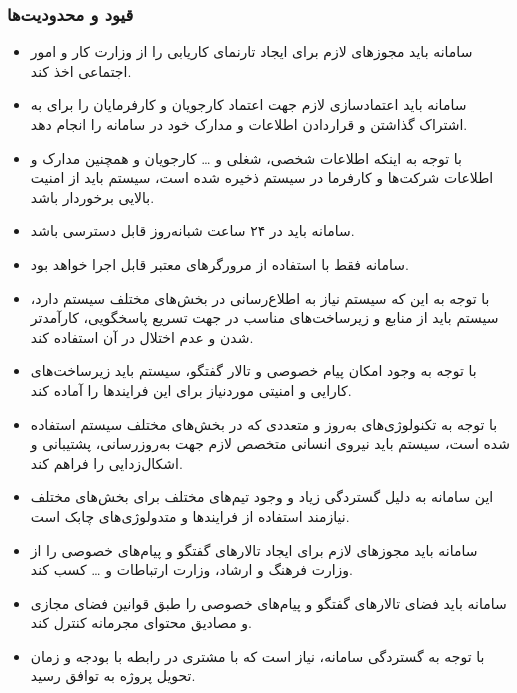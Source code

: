 \documentclass[12pt]{article}
\begin{document}
	\subsubsection{قیود و محدودیت‌ها}
	\begin{itemize}
		\item
		سامانه باید مجوز‌های لازم برای ایجاد تارنمای کاریابی را از وزارت کار و امور اجتماعی اخذ کند.
		\item
		سامانه باید اعتماد‌سازی لازم جهت اعتماد کارجویان و کارفرمایان را برای به اشتراک گذاشتن و قرار‌دادن اطلاعات و مدارک خود در سامانه را انجام دهد.
		\item
		با توجه به اینکه اطلاعات شخصی، شغلی و … کارجویان و همچنین مدارک و اطلاعات شرکت‌ها و کارفرما در سیستم ذخیره شده است، سیستم باید از امنیت بالایی برخوردار باشد.
		\item
		سامانه باید در ۲۴ ساعت شبانه‌روز قابل دسترسی باشد.
		\item
		سامانه فقط با استفاده از مرورگر‌های معتبر قابل اجرا خواهد‌ بود.
		\item
		با توجه به این که سیستم نیاز به اطلاع‌رسانی در بخش‌های مختلف سیستم دارد، سیستم باید از منابع و زیرساخت‌های مناسب در جهت تسریع پاسخگویی، کارآمدتر شدن و عدم اختلال در آن استفاده کند.
		\item
		با توجه به وجود امکان پیام خصوصی و تالار گفتگو، سیستم باید زیرساخت‌های کارایی و امنیتی مورد‌نیاز برای این فرایند‌ها را آماده کند.
		\item
		با توجه به تکنولوژی‌های به‌روز و متعددی که در بخش‌های مختلف سیستم استفاده شده است، سیستم باید نیروی انسانی متخصص لازم جهت به‌روزرسانی، پشتیبانی و اشکال‌زدایی را فراهم کند.
		\item
		این سامانه به دلیل گستردگی زیاد و وجود تیم‌های مختلف برای بخش‌های مختلف نیازمند استفاده از فرایند‌ها و متدولوژی‌های چابک است.
		\item
		سامانه باید مجوزهای لازم برای ایجاد تالار‌های گفتگو و پیام‌های خصوصی را از وزارت فرهنگ و ارشاد، وزارت ارتباطات و … کسب کند.
		\item
		سامانه باید فضای تالار‌های گفتگو و پیام‌های خصوصی را طبق قوانین فضای مجازی و مصادیق محتوای مجرمانه کنترل کند.
		\item
		با توجه به گستردگی سامانه، نیاز است که با مشتری در رابطه با بودجه و زمان تحویل پروژه به توافق رسید.
	\end{itemize}
\end{document}
